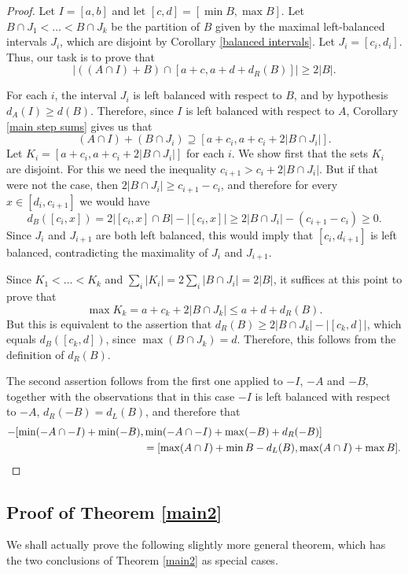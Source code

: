 \documentclass[11pt,reqno]{amsart}
\theoremstyle{definition}
\def\supset{\supseteq}
\begin{document}
\begin{proof}
Let $I=[a,b]$ and let $[c,d]=[\min B,\max B]$. Let $B\cap J_1<\dots<B\cap J_k$ be the partition of $B$ given by the maximal left-balanced intervals $J_i$, which are disjoint by Corollary \ref{balanced intervals}. Let $J_i=[c_i,d_i]$. Thus, our task is to prove that 
\[|((A\cap I)+B)\cap[a+c,a+d+d_R(B)]|\geq 2|B|.\]

For each $i$, the interval $J_i$ is left balanced with respect to $B$, and by hypothesis $d_A(I)\geq d(B)$. Therefore, since $I$ is left balanced with respect to $A$, Corollary \ref{main step sums} gives us that
\[
(A\cap I)+(B\cap J_i)\supset[a+c_i,a+c_i+2|B\cap J_i|].
\]
Let $K_i=[a+c_i,a+c_i+2|B\cap J_i|]$ for each $i$. We show first that the sets $K_i$ are disjoint. For this we need the inequality $c_{i+1}>c_i+2|B\cap J_i|$. But if that were not the case, then $2|B\cap J_i|\geq c_{i+1}-c_i$, and therefore for every $x\in[d_i,c_{i+1}]$ we would have
\[d_B([c_i,x])=2|[c_i,x]\cap B|-|[c_i,x]|\geq 2|B\cap J_i|-(c_{i+1}-c_i)\geq 0.\]
Since $J_i$ and $J_{i+1}$ are both left balanced, this would imply that $[c_i,d_{i+1}]$ is left balanced, contradicting the maximality of $J_i$ and $J_{i+1}$. 

Since $K_1<\dots<K_k$ and $\sum_i|K_i|=2\sum_i|B\cap J_i|=2|B|$, it suffices at this point to prove that 
\[\max K_k=a+c_k+2|B\cap J_k|\leq a+d+d_R(B).\]
But this is equivalent to the assertion that $d_R(B)\geq 2|B\cap J_k|-|[c_k,d]|$, which equals $d_B([c_k,d])$, since $\max(B\cap J_k)=d$. Therefore, this follows from the definition of $d_R(B)$. 

The second assertion follows from the first one applied to $-I$, $-A$ and $-B$, together with the observations that in this case $-I$ is left balanced with respect to $-A$, $d_R(-B)=d_L(B)$, and therefore that
\begin{align*}-[\min(-A\cap -I)+\min(-B),&\min(-A\cap -I)+\max(-B)+d_R(-B)]\\
&=[\max(A\cap I)+\min B-d_L(B),\max(A\cap I)+\max B].\qedhere\\
\end{align*}
\end{proof}



\subsection{Proof of Theorem \ref{main2}}

We shall actually prove the following slightly more general theorem, which has the two conclusions of Theorem \ref{main2} as special cases.
\end{document}
